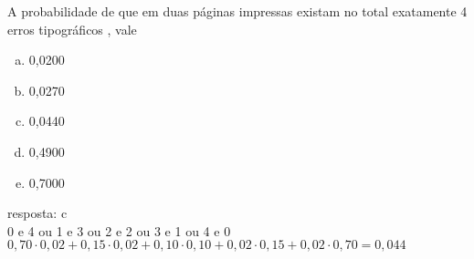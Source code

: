\begin{ex}
A probabilidade de que em duas páginas impressas existam no total exatamente 4 erros tipográficos , vale\;
   \begin{enumerate}[(a)]
   \item 0,0200
   \item 0,0270
   \item 0,0440
   \item 0,4900
   \item 0,7000
   \end{enumerate}
    \begin{sol}
     resposta: c \\
     0 e 4 ou 1 e 3 ou 2 e 2 ou 3 e 1 ou 4 e 0 \\
     $0,70\cdot0,02+0,15\cdot0,02+0,10\cdot0,10+0,02\cdot0,15+0,02\cdot0,70=0,044 $
    \end{sol}
    
\end{ex}